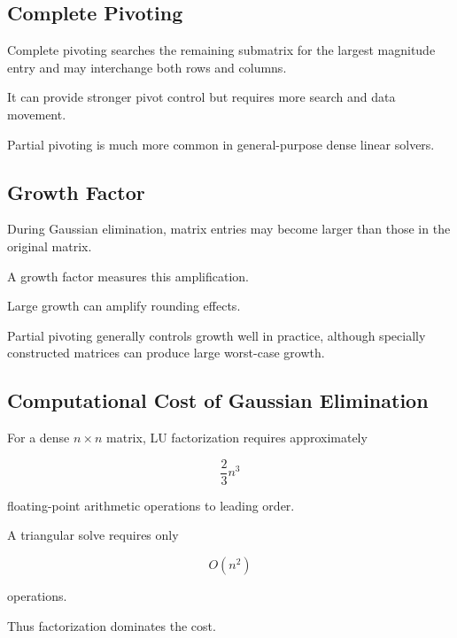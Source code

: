 \subsection{Complete Pivoting}
\label{subsec:complete-pivoting}

Complete pivoting searches the remaining submatrix for the largest
magnitude entry and may interchange both rows and columns.

It can provide stronger pivot control but requires more search and data
movement.

Partial pivoting is much more common in general-purpose dense linear
solvers.

\subsection{Growth Factor}
\label{subsec:growth-factor}

During Gaussian elimination, matrix entries may become larger than those in
the original matrix.

A growth factor measures this amplification.

Large growth can amplify rounding effects.

Partial pivoting generally controls growth well in practice, although
specially constructed matrices can produce large worst-case growth.

\subsection{Computational Cost of Gaussian Elimination}
\label{subsec:gaussian-elimination-cost}

For a dense \(n\times n\) matrix, LU factorization requires approximately

\[
\boxed{
\frac{2}{3}n^3
}
\]

floating-point arithmetic operations to leading order.

A triangular solve requires only

\[
\boxed{
O(n^2)
}
\]

operations.

Thus factorization dominates the cost.

